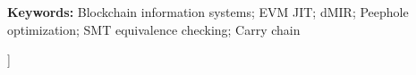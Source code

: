 \documentclass[10pt,a4paper,twocolumn]{article}
\begin{document}
\begin{@twocolumnfalse}
\begin{center}
{\noindent\textbf{Keywords: }Blockchain information systems; EVM JIT; dMIR; Peephole optimization; SMT equivalence checking; Carry chain
}
\end{center}
\vspace{1.0em}
\end{@twocolumnfalse}
]





\FloatBarrier

\FloatBarrier




\end{document}
